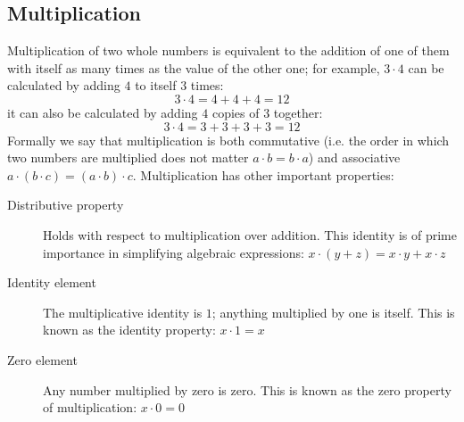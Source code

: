 \subsection{Multiplication}
Multiplication of two whole numbers is equivalent to the addition of one of them with itself as many times as the value of the other one; for example, $3 \cdot 4$ can be calculated by adding $4$ to itself $3$ times:
\[
3 \cdot 4 = 4 + 4 + 4 = 12
\]
it can also be calculated by adding $4$ copies of $3$ together:
\[
3 \cdot 4 = 3 + 3 + 3 + 3 = 12
\]
Formally we say that multiplication is both commutative (i.e. the order in which two numbers are multiplied does not matter $a \cdot b = b \cdot a$) and associative $a \cdot (b \cdot c) = (a \cdot b) \cdot c$. Multiplication has other important properties:
\begin{description}
\item [Distributive property] Holds with respect to multiplication over addition. This identity is of prime importance in simplifying algebraic expressions: $x\cdot(y + z) = x\cdot y + x\cdot z$
\item [Identity element] The multiplicative identity is $1$; anything multiplied by one is itself. This is known as the identity property: $x\cdot 1 = x$
\item [Zero element] Any number multiplied by zero is zero. This is known as the zero property of multiplication: $x\cdot  0 = 0$
\end{description}

